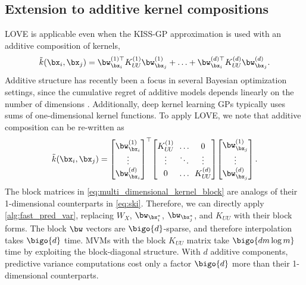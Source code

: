 

\subsection{Extension to additive kernel compositions}
LOVE{} is applicable even when the KISS-GP approximation is used with an additive composition of kernels,
%
\begin{equation}
  \tilde{k}(\bx_i, \bx_j) =
  \bw^{(1)\top}_{\bx_i} K^{(1)}_{U \! U} \bw^{(1)}_{\bx_j} + \ldots + \bw^{(d)\top}_{\bx_i} K^{(d)}_{U \! U} \bw^{(d)}_{\bx_j}.
  \notag
\end{equation}
Additive structure has recently been a focus in several Bayesian optimization settings, since the cumulative regret of additive models depends linearly on the number of dimensions
\cite{kandasamy2015high,wang2017batched,gardner2017discovering,wang2017max}.
Additionally, deep kernel learning GPs \citep{wilson2016stochastic,wilson2016deep} typically uses sums of one-dimensional kernel functions.
To apply LOVE{}, we note that additive composition can be re-written as
%
\begin{equation}
  \tilde{k}(\bx_i, \bx_j) =
  \begin{bmatrix}
    \bw^{(1)}_{\bx_i} \\
    \vdots \\
    \bw^{(d)}_{\bx_i}
  \end{bmatrix}^\top
  \!
  \begin{bmatrix}
    K^{(1)}_{U \! U} & \!\! \ldots \!\! & 0 \\
    \vdots & \!\! \ddots \!\! & \vdots \\
    0 & \!\! \ldots \!\! & K^{(d)}_{U \! U}
  \end{bmatrix}
  \!
  \begin{bmatrix}
    \bw^{(1)}_{\bx_j} \\
    \vdots \\
    \bw^{(d)}_{\bx_j}
  \end{bmatrix}.
  \label{eq:multi_dimensional_kernel_block}
\end{equation}
%
The block matrices in \eqref{eq:multi_dimensional_kernel_block} are analogs of their 1-dimensional counterparts in \eqref{eq:ski}.
Therefore, we can directly apply \autoref{alg:fast_pred_var}, replacing $W_X$, $\bw_{\bx^*_i}$, $\bw_{\bx^*_j}$, and $K_{UU}$ with their block forms.
The block $\bw$ vectors are $\bigo{d}$-sparse, and therefore interpolation takes $\bigo{d}$ time.
MVMs with the block $K_{UU}$ matrix take $\bigo{dm\log m}$ time by exploiting the block-diagonal structure. With $d$ additive components, predictive variance computations cost only a factor $\bigo{d}$ more than their 1-dimensional counterparts.
